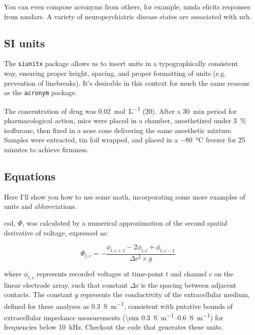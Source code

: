 \documentclass[../../main.tex]{subfiles}  %
\begin{document}
	You can even compose acronyms from others, for example, \gls{nmda} elicits responses from \glspl{nmdar}. 
	A variety of neuropsychiatric disease states are associated with \gls{nrh}.

	\subsection{SI units}

	The \verb|siunitx| package allows us to insert units in a typographically consistent way, ensuring proper height, spacing, and proper formatting of units (e.g. prevention of linebreaks).
	It's desirable in this context for much the same reasons as the \verb|acronym| package.


	The concentration of drug was \SI[per-mode=fraction]{0.02}{\mol\per\L} (\SI{20}{\mM}).
	After a \SI{30}{\minute} period for pharmacological action, mice were placed in a chamber, anesthetized under \qty{3}{\percent} isoflurane, then fixed in a nose cone delivering the same anesthetic mixture. 
	Samples were extracted, tin foil wrapped, and placed in a \SI{-80}{\degreeCelsius} freezer for 25 minutes to achieve firmness.

	\subsection{Equations}

	Here I'll show you how to use some math, incorporating some more examples of units and abbreviations.

	\Acrfull{csd}, $\Phi$, was calculated by a numerical approximation of the second spatial derivative of voltage, expressed as:

	\begin{equation}
		\Phi_{t, c} = -\frac{\phi_{t, c+1} - 2\phi_{t, c} + \phi_{t, c-1}}{\Delta c^2 \times g}
	\end{equation}

	where $\phi_{t, c}$ represents recorded voltages at time-point $t$ and channel $c$ on the linear electrode array, such that constant $\Delta c$ is the spacing between adjacent contacts. 
	The constant $g$ represents the conductivity of the extracellular medium, defined for these analyses as \SI[per-mode=fraction]{0.3}{\siemens\per\m}, consistent with putative bounds of extracellular impedance measurements (\qtyrange[range-units=single,range-phrase=-]{\sim 0.3}{0.6}{\siemens\per\m}) for frequencies below \SI{10}{\kHz}. 
	Checkout the code that generates these units. 
\end{document}
